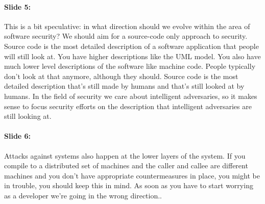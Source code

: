 \documentclass[10pt,a4paper]{report}
\begin{document}
\paragraph{Slide 5:} This is a bit speculative: in what direction should we evolve within the area of software security? We should aim for a source-code only approach to security. Source code is the most detailed description of a software application that people will still look at. You have higher descriptions like the UML model. You also have much lower level descriptions of the software like machine code. People typically don't look at that anymore, although they should. Source code is the most detailed description that's still made by humans and that's still looked at by humans. In the field of security we care about intelligent adversaries, so it makes sense to focus security efforts on the description that intelligent adversaries are still looking at. 

\paragraph{Slide 6:} Attacks against systems also happen at the lower layers of the system. If you compile to a distributed set of machines and the caller and callee are different machines and you don't have appropriate countermeasures in place, you might be in trouble, you should keep this in mind. As soon as you have to start worrying as a developer we're going in the wrong direction..
\end{document}
